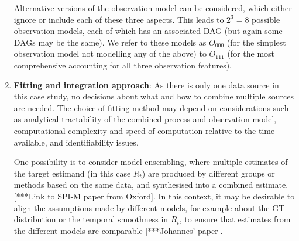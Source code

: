 \documentclass{article}
\begin{document}
\begin{enumerate}
Alternative versions of the observation model can be considered, which either ignore or include each of these three aspects. This leads to $2^3=8$ possible observation models, each of which has an associated DAG (but again some DAGs may be the same).
We refer to these models as $O_{000}$ (for the simplest observation model not modelling any of the above) to $O_{111}$ (for the most comprehensive accounting for all three observation features).

\item \textbf{Fitting and integration approach}: As there is only one data source in this case study, no decisions about what and how to combine multiple sources are needed. The choice of fitting method may depend on considerations such as analytical tractability of the combined process and observation model, computational complexity and speed of computation relative to the time available, and identifiability issues. 
 

One possibility is to consider model ensembling, where multiple estimates of the target estimand (in this case $R_t$) are produced by different groups or methods based on the same data, and synthesised into a combined estimate. [***Link to SPI-M paper from Oxford]. In this context, it may be desirable to align the assumptions made by different models, for example about the GT distribution or the temporal smoothness in $R_t$, to ensure that estimates from the different models are  comparable [***Johannes’ paper].


\end{enumerate}
\end{document}
